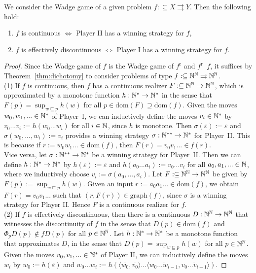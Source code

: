 \documentclass{amsart}
\def\IN{{\Bbb{N}}}
\def\In{\subseteq}
\def\prefix{\sqsubseteq}
\def\mto{\rightrightarrows}
\def\equivSW{\mathop{\equiv_{\mathrm{sW}}}}
\def\equivSW{\mathop{\equiv_{\mathrm{sW}}}}
\def\dom{{\mathrm{dom}}}
\def\graph{{\mathrm{graph}}}
\def\r{\mathrm{r}}
\begin{document}
\begin{theorem}
\label{thm:Wadge-game}
We consider the Wadge game of a given problem ${f:\In X\mto Y}$.
Then the following hold:
\begin{enumerate}
\item $f$ is continuous $\iff$ Player II has a winning strategy for $f$,
\item $f$ is effectively discontinuous $\iff$ Player I has a winning strategy for $f$.
\end{enumerate}
\end{theorem}
\begin{proof}
Since the Wadge game of $f$ is the Wadge game of $f^\r$ and $f^\r\equivSW f$, it suffices by 
Theorem~\ref{thm:dichotomy} to consider problems of type $f:\In\IN^\IN\mto\IN^\IN$.\smallskip\\
(1) If $f$ is continuous, then $f$ has a continuous realizer $F:\In\IN^\IN\to\IN^\IN$, which is approximated
by a monotone function $h:\IN^*\to\IN^*$ in the sense that $F(p)=\sup_{w\prefix p}h(w)$ for all $p\in\dom(F)\supseteq\dom(f)$. Given the moves $w_0,w_1,...\in\IN^*$ of Player~I, we can
inductively define the moves $v_i\in\IN^*$ by $v_0...v_i:=h(w_0...w_i)$ for all $i\in\IN$, since $h$ is monotone.
Then $\sigma(\varepsilon):=\varepsilon$ and $\sigma(w_0,...,w_i):=v_i$ provides a winning strategy
$\sigma:\IN^{**}\to\IN^*$ for Player~II.
This is because if $r:=w_0w_1...\in\dom(f)$, then $F(r)=v_0v_1...\in f(r)$.\smallskip\\
Vice versa, let $\sigma:\IN^{**}\to\IN^*$ be a winning strategy for Player~II.
Then we can define $h:\IN^*\to\IN^*$ by $h(\varepsilon):=\varepsilon$ and $h(a_0...a_i):=v_0...v_i$ for all $a_0,a_1,...\in\IN$,
where we inductively choose  $v_i:=\sigma(a_0,...,a_i)$.
Let $F:\In\IN^\IN\to\IN^\IN$ be given by $F(p):=\sup_{w\prefix p}h(w)$.
Given an input $r:=a_0a_1...\in\dom(f)$, we obtain $F(r)=v_0v_1...$ such that
$(r,F(r))\in\graph(f)$, since $\sigma$ is a winning strategy for Player II. 
Hence $F$ is a continuous realizer for $f$.\medskip\\
(2) If $f$ is effectively discontinuous, then there is a continuous $D:\IN^\IN\to\IN^\IN$
that witnesses the discontinuity of $f$ in the sense that $D(p)\in\dom(f)$ and
$\Phi_pD(p)\not\in fD(p)$ for all $p\in\IN^\IN$.
Let $h:\IN^*\to\IN^*$ be a monotone function that approximates $D$, in the sense
that $D(p)=\sup_{w\prefix p}h(w)$ for all $p\in\IN^\IN$.
Given the moves $v_0,v_1,...\in\IN^*$ of Player II, we can inductively
define the moves $w_i$ by $w_0:=h(\varepsilon)$ and  $w_0...w_i:=h(\langle\overline{w_0},\overline{v_0}\rangle...\langle\overline{w_0...w_{i-1}},\overline{v_0...v_{i-1}}\rangle)$. 

\end{proof}
\end{document}
